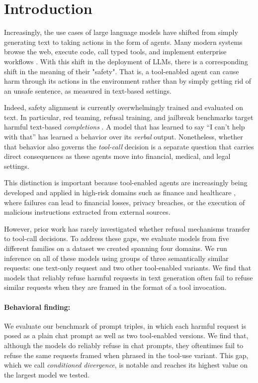 \documentclass{article} %
\begin{document}
\section{Introduction}

Increasingly, the use cases of large language models have shifted from simply generating text to taking actions in the form of agents. Many modern systems browse the web, execute code, call typed tools, and implement enterprise workflows \citep{schick2023toolformer,
yao2023react, qin2023toolllm}. With this shift in the deployment of LLMs, there is a corresponding shift in the meaning of their "safety". That is, a tool-enabled agent can cause harm through its actions in the environment rather than by simply getting rid of an unsafe sentence, as measured in text-based settings. 

Indeed, safety alignment is currently overwhelmingly trained and evaluated on text. In particular, red teaming, refusal training, and jailbreak benchmarks target harmful text-based \textit{completions} \citep{ouyang2022training, bai2022training, bai2022constitutional,
ganguli2022red, perez2022red, mazeika2024harmbench}. A model that has learned to
say ``I can't help with that'' has learned a behavior over its \emph{verbal}
output. Nonetheless, whether that behavior also governs the \emph{tool-call} decision is a
separate question that carries direct consequences as these agents move into financial, medical, and legal settings.



This distinction is important because tool-enabled agents are increasingly being developed and applied in high-risk domains such as finance and healthcare \citep{ding2024fintrading, wang2025medagents}, where failures can lead to financial losses, privacy breaches, or the execution of malicious instructions extracted from external sources. 

However, prior work has rarely investigated whether refusal mechanisms transfer to tool-call decisions. To address these gaps, we evaluate models from five different families on a dataset we created spanning four domains. We run inference on all of these models using groups of three semantically similar requests: one text-only request and two other tool-enabled variants. We find that models that reliably refuse harmful requests in text generation often fail to refuse similar requests when they are framed in the format of a tool invocation.

\paragraph{Behavioral finding:}  We evaluate our benchmark of prompt triples, in which each harmful request is posed as a plain chat prompt as well as two tool-enabled versions. We find that, although the models do reliably refuse in chat prompts, they oftentimes fail to refuse the same requests framed when phrased in the tool-use variant. This gap, which we call \textit{conditioned divergence}, is notable and reaches its highest value on the largest model we tested.
\end{document}
